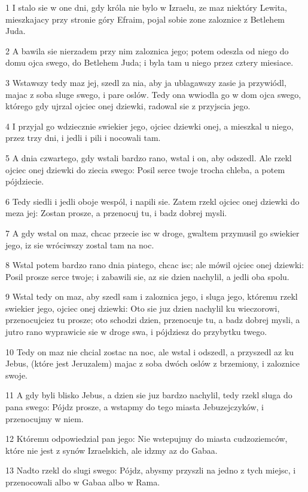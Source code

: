 \par 1 I stalo sie w one dni, gdy króla nie bylo w Izraelu, ze maz niektóry Lewita, mieszkajacy przy stronie góry Efraim, pojal sobie zone zaloznice z Betlehem Juda.
\par 2 A bawila sie nierzadem przy nim zaloznica jego; potem odeszla od niego do domu ojca swego, do Betlehem Juda; i byla tam u niego przez cztery miesiace.
\par 3 Wstawszy tedy maz jej, szedl za nia, aby ja ublagawszy zasie ja przywiódl, majac z soba sluge swego, i pare oslów. Tedy ona wwiodla go w dom ojca swego, którego gdy ujrzal ojciec onej dziewki, radowal sie z przyjscia jego.
\par 4 I przyjal go wdziecznie swiekier jego, ojciec dziewki onej, a mieszkal u niego, przez trzy dni, i jedli i pili i nocowali tam.
\par 5 A dnia czwartego, gdy wstali bardzo rano, wstal i on, aby odszedl. Ale rzekl ojciec onej dziewki do ziecia swego: Posil serce twoje trocha chleba, a potem pójdziecie.
\par 6 Tedy siedli i jedli oboje wespól, i napili sie. Zatem rzekl ojciec onej dziewki do meza jej: Zostan prosze, a przenocuj tu, i badz dobrej mysli.
\par 7 A gdy wstal on maz, chcac przecie isc w droge, gwaltem przymusil go swiekier jego, iz sie wróciwszy zostal tam na noc.
\par 8 Wstal potem bardzo rano dnia piatego, chcac isc; ale mówil ojciec onej dziewki: Posil prosze serce twoje; i zabawili sie, az sie dzien nachylil, a jedli oba spolu.
\par 9 Wstal tedy on maz, aby szedl sam i zaloznica jego, i sluga jego, któremu rzekl swiekier jego, ojciec onej dziewki: Oto sie juz dzien nachylil ku wieczorowi, przenocujciez tu prosze; oto schodzi dzien, przenocuje tu, a badz dobrej mysli, a jutro rano wyprawicie sie w droge swa, i pójdziesz do przybytku twego.
\par 10 Tedy on maz nie chcial zostac na noc, ale wstal i odszedl, a przyszedl az ku Jebus, (które jest Jeruzalem) majac z soba dwóch oslów z brzemiony, i zaloznice swoje.
\par 11 A gdy byli blisko Jebus, a dzien sie juz bardzo nachylil, tedy rzekl sluga do pana swego: Pójdz prosze, a wstapmy do tego miasta Jebuzejczyków, i przenocujmy w niem.
\par 12 Któremu odpowiedzial pan jego: Nie wstepujmy do miasta cudzoziemców, które nie jest z synów Izraelskich, ale idzmy az do Gabaa.
\par 13 Nadto rzekl do slugi swego: Pójdz, abysmy przyszli na jedno z tych miejsc, i przenocowali albo w Gabaa albo w Rama.
